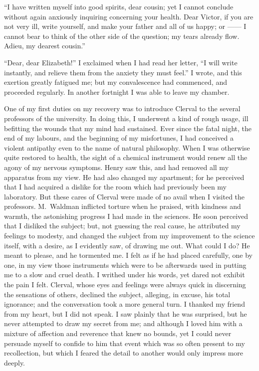 ``I have written myself into good
spirits, dear cousin; yet I cannot conclude
without again anxiously inquiring
concerning your health. Dear
Victor, if you are not very ill, write
yourself, and make your father and all
of us happy; or ------ I cannot bear to
think of the other side of the question;
my tears already flow. Adieu, my
dearest cousin.''


``Dear, dear Elizabeth!'' I exclaimed
when I had read her letter, ``I will
write instantly, and relieve them from
the anxiety they must feel.'' I wrote,
and this exertion greatly fatigued me;
but my convalescence had commenced,
and proceeded regularly. In another
fortnight I was able to leave my chamber.

One of my first duties on my recovery
was to introduce Clerval to the
several professors of the university. In
doing this, I underwent a kind of rough
usage, ill befitting the wounds that my
mind had sustained. Ever since the
fatal night, the end of my labours, and
the beginning of my misfortunes, I had
conceived a violent antipathy even to
the name of natural philosophy. When
I was otherwise quite restored to health,
the sight of a chemical instrument
would renew all the agony of my nervous
symptoms. Henry saw this, and
had removed all my apparatus from
my view. He had also changed my
apartment; for he perceived that I had
acquired a dislike for the room which
had previously been my laboratory.
But these cares of Clerval were made
of no avail when I visited the professors.
M.~Waldman inflicted torture
when he praised, with kindness and
warmth, the astonishing progress I had
made in the sciences. He soon perceived
that I disliked the subject; but,
not guessing the real cause, he attributed
my feelings to modesty, and
changed the subject from my improvement
to the science itself, with a desire,
as I evidently saw, of drawing me
out. What could I do? He meant to
please, and he tormented me. I felt as
if he had placed carefully, one by one, in
my view those instruments which were
to be afterwards used in putting me to
a slow and cruel death. I writhed
under his words, yet dared not exhibit
the pain I felt. Clerval, whose eyes
and feelings were always quick in discerning
the sensations of others, declined
the subject, alleging, in excuse,
his total ignorance; and the conversation
took a more general turn. I
thanked my friend from my heart, but
I did not speak. I saw plainly that he
was surprised, but he never attempted
to draw my secret from me; and although
I loved him with a mixture of
affection and reverence that knew no
bounds, yet I could never persuade
myself to confide to him that event
which was so often present to my recollection,
but which I feared the detail
to another would only impress more
deeply.

